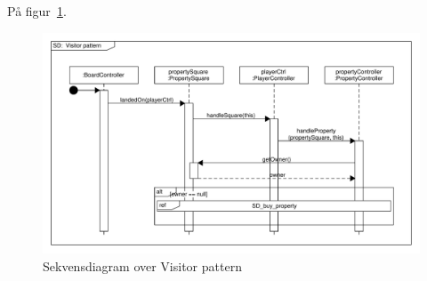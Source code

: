 \documentclass[class=article, crop=false]{standalone}
\begin{document}
    På figur~\ref{fig:SD_landed_on}.

    \begin{figure}[H]
        \centering

        \hbox{\hspace{-1cm}\includegraphics[scale=0.6]{diagrams/SD_landed_on.pdf}}
        \caption{Sekvensdiagram over Visitor pattern}\label{fig:SD_landed_on}
    \end{figure}
\end{document}
